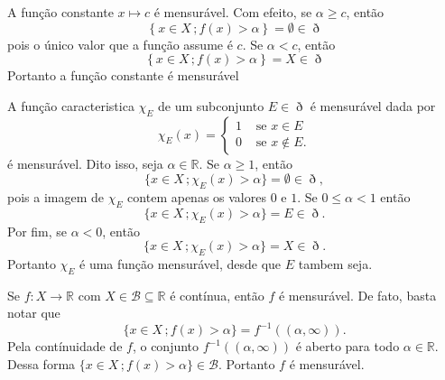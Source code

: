 \documentclass[a4paper, 11pt]{book}
\theoremstyle{definition}
\newcommand{\bR}{\mathbb{R}}
\newcommand{\cB}{\mathcal{B}}
\begin{document}
\begin{ex}
    A função constante $x \mapsto c$ é mensurável.
    Com efeito, se $\alpha \geqslant c$, então
    \[
        \left\{ x \in X \,; f(x) > \alpha \right\} = \emptyset \in \eth
    \]
    pois o único valor que a função assume é $c$.
    Se $\alpha < c$, então
    \[
        \left\{ x \in X \,; f(x) > \alpha \right\} = X \in \eth
    \]
    Portanto a função constante é mensurável
\end{ex}

\begin{ex}
    A função caracteristica $\chi_E$ de um subconjunto $E \in \eth$ é mensurável dada por
    \[
        \chi_E(x) = \left\{ 
            \begin{aligned}
                1 & \text{ se } x \in E\\
                0 & \text{ se } x \not\in E.
            \end{aligned}
        \right.
    \]
    é mensurável.
    Dito isso, seja $\alpha \in \bR$.
    Se $\alpha \geqslant 1$, então
    \[
        \{x \in X \,; \chi_E(x) > \alpha\} = \emptyset \in \eth,
    \]
    pois a imagem de $\chi_E$ contem apenas os valores $0$ e $1$.
    Se $0 \leqslant \alpha < 1$ então
    \[
        \{x \in X \,; \chi_E(x) > \alpha\} = E \in \eth.
    \]
    Por fim, se $\alpha < 0$, então
    \[
        \{x \in X \,; \chi_E(x) > \alpha\} = X \in \eth.
    \]
    Portanto $\chi_E$ é uma função mensurável, desde que $E$ tambem seja.
\end{ex}

\begin{ex}
    Se $f : X \to \bR$ com $X \in \cB \subseteq \bR$ é contínua, então $f$ é mensurável. De fato, basta notar que
    \[
        \{ x \in X \,; f(x) > \alpha\} = f^{-1}((\alpha,\infty)).
    \]
    Pela contínuidade de $f$, o conjunto $f^{-1}((\alpha,\infty))$ é aberto para todo $\alpha \in \bR$.
    Dessa forma $\{x \in X \,; f(x) > \alpha\} \in \cB$.
    Portanto $f$ é mensurável.
\end{ex}
\end{document}
